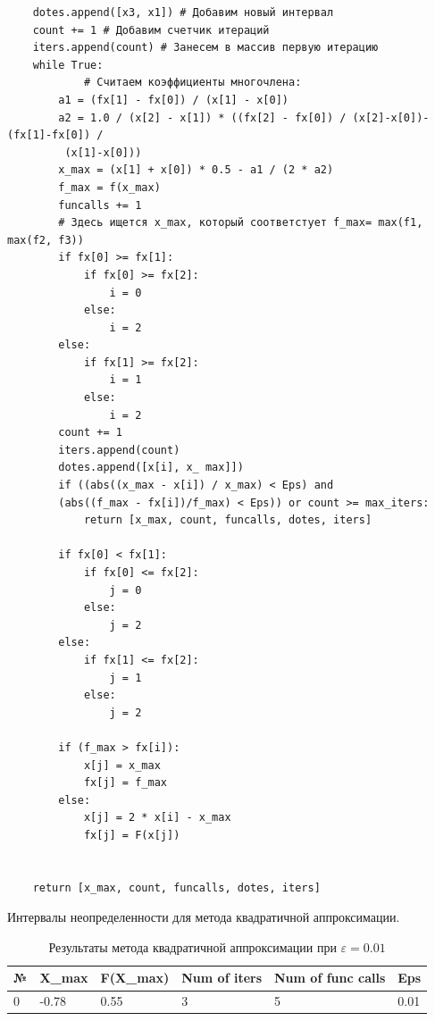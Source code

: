 \documentclass[10pt]{article}
\begin{document}
\begin{enumerate}
\begin{verbatim}
    dotes.append([x3, x1]) # Добавим новый интервал
    count += 1 # Добавим счетчик итераций
    iters.append(count) # Занесем в массив первую итерацию
    while True:
    		# Считаем коэффициенты многочлена:
        a1 = (fx[1] - fx[0]) / (x[1] - x[0])
        a2 = 1.0 / (x[2] - x[1]) * ((fx[2] - fx[0]) / (x[2]-x[0])-(fx[1]-fx[0]) /
         (x[1]-x[0]))
        x_max = (x[1] + x[0]) * 0.5 - a1 / (2 * a2)
        f_max = f(x_max)
        funcalls += 1
        # Здесь ищется x_max, который соответстует f_max= max(f1, max(f2, f3))
        if fx[0] >= fx[1]:
            if fx[0] >= fx[2]:
                i = 0
            else:
                i = 2
        else:
            if fx[1] >= fx[2]:
                i = 1
            else:
                i = 2
        count += 1
        iters.append(count)
        dotes.append([x[i], x_ max]]) 
        if ((abs((x_max - x[i]) / x_max) < Eps) and 
        (abs((f_max - fx[i])/f_max) < Eps)) or count >= max_iters:
            return [x_max, count, funcalls, dotes, iters]
        
        if fx[0] < fx[1]:
            if fx[0] <= fx[2]:
                j = 0
            else:
                j = 2
        else:
            if fx[1] <= fx[2]:
                j = 1
            else:
                j = 2
        
        if (f_max > fx[i]):
            x[j] = x_max
            fx[j] = f_max
        else:
            x[j] = 2 * x[i] - x_max
            fx[j] = F(x[j])
        
        
    return [x_max, count, funcalls, dotes, iters]
\end{verbatim}
\newpage
\begin{center}
Интервалы неопределенности для метода квадратичной аппроксимации.
\end{center}


\begin{table}[H]
\caption{Результаты метода квадратичной аппроксимации при $\varepsilon = 0.01$}
\begin{center}
\begin{tabular}{|l|l|l|l|l|l|}
\hline
№ & X\_max    & F(X\_max) & Num of iters & Num of func calls & Eps  \\
\hline
    0 & -0.78  &   0.55 &               3 &                   5 &
0.01 \\
\hline
\end{tabular}
\end{center}
\end{table}


\end{enumerate}
\end{document}
